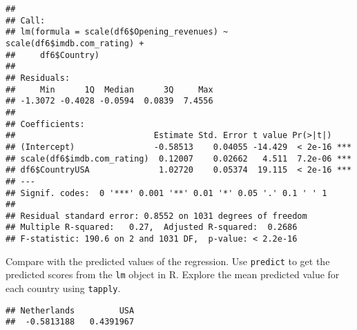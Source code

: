 \documentclass[
]{article}
\newenvironment{Shaded}{\begin{snugshade}}{\end{snugshade}}
\newcommand{\CommentTok}[1]{\textcolor[rgb]{0.56,0.35,0.01}{\textit{#1}}}
\newcommand{\DataTypeTok}[1]{\textcolor[rgb]{0.13,0.29,0.53}{#1}}
\newcommand{\KeywordTok}[1]{\textcolor[rgb]{0.13,0.29,0.53}{\textbf{#1}}}
\newcommand{\NormalTok}[1]{#1}
\newcommand{\OperatorTok}[1]{\textcolor[rgb]{0.81,0.36,0.00}{\textbf{#1}}}
\newcommand{\StringTok}[1]{\textcolor[rgb]{0.31,0.60,0.02}{#1}}
\begin{document}
\begin{Shaded}
\end{Shaded}

\begin{verbatim}
## 
## Call:
## lm(formula = scale(df6$Opening_revenues) ~ scale(df6$imdb.com_rating) + 
##     df6$Country)
## 
## Residuals:
##     Min      1Q  Median      3Q     Max 
## -1.3072 -0.4028 -0.0594  0.0839  7.4556 
## 
## Coefficients:
##                            Estimate Std. Error t value Pr(>|t|)    
## (Intercept)                -0.58513    0.04055 -14.429  < 2e-16 ***
## scale(df6$imdb.com_rating)  0.12007    0.02662   4.511  7.2e-06 ***
## df6$CountryUSA              1.02720    0.05374  19.115  < 2e-16 ***
## ---
## Signif. codes:  0 '***' 0.001 '**' 0.01 '*' 0.05 '.' 0.1 ' ' 1
## 
## Residual standard error: 0.8552 on 1031 degrees of freedom
## Multiple R-squared:   0.27,  Adjusted R-squared:  0.2686 
## F-statistic: 190.6 on 2 and 1031 DF,  p-value: < 2.2e-16
\end{verbatim}

Compare with the predicted values of the regression. Use
\texttt{predict} to get the predicted scores from the \texttt{lm} object
in R. Explore the mean predicted value for each country using
\texttt{tapply}.

\begin{Shaded}
\end{Shaded}

\begin{verbatim}
## Netherlands         USA 
##  -0.5813188   0.4391967
\end{verbatim}
\end{document}
